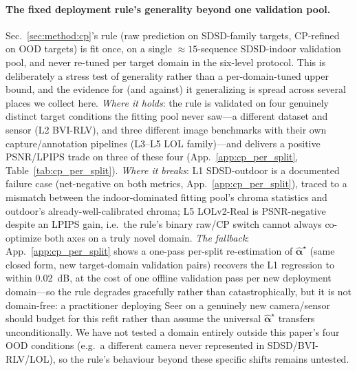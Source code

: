 \paragraph{The fixed deployment rule's generality beyond one validation pool.} Sec.~\ref{sec:method:cp}'s rule (raw prediction on SDSD-family targets, CP-refined on OOD targets) is fit once, on a single $\approx\!15$-sequence SDSD-indoor validation pool, and never re-tuned per target domain in the six-level protocol. This is deliberately a stress test of generality rather than a per-domain-tuned upper bound, and the evidence for (and against) it generalizing is spread across several places we collect here. \emph{Where it holds}: the rule is validated on four genuinely distinct target conditions the fitting pool never saw---a different dataset and sensor (L2 BVI-RLV), and three different image benchmarks with their own capture/annotation pipelines (L3--L5 LOL family)---and delivers a positive PSNR/LPIPS trade on three of these four (App.~\ref{app:cp_per_split}, Table~\ref{tab:cp_per_split}). \emph{Where it breaks}: L1 SDSD-outdoor is a documented failure case (net-negative on both metrics, App.~\ref{app:cp_per_split}), traced to a mismatch between the indoor-dominated fitting pool's chroma statistics and outdoor's already-well-calibrated chroma; L5 LOLv2-Real is PSNR-negative despite an LPIPS gain, i.e.\ the rule's binary raw/CP switch cannot always co-optimize both axes on a truly novel domain. \emph{The fallback}: App.~\ref{app:cp_per_split} shows a one-pass per-split re-estimation of $\widehat{\boldsymbol{\alpha}}^{\star}$ (same closed form, new target-domain validation pairs) recovers the L1 regression to within $0.02$~dB, at the cost of one offline validation pass per new deployment domain---so the rule degrades gracefully rather than catastrophically, but it is not domain-free: a practitioner deploying Seer on a genuinely new camera/sensor should budget for this refit rather than assume the universal $\widehat{\boldsymbol{\alpha}}^{\star}$ transfers unconditionally. We have not tested a domain entirely outside this paper's four OOD conditions (e.g.\ a different camera never represented in SDSD/BVI-RLV/LOL), so the rule's behaviour beyond these specific shifts remains untested.

